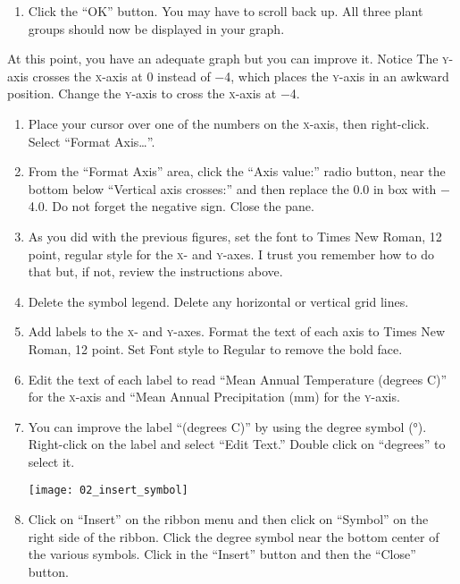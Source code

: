 \documentclass[12pt, hidelinks]{exam}
\newcommand*\axis[1]{{\scshape #1}-axis}
\begin{document}
\begin{questions}
\begin{enumerate}[resume]
	\item Click the “OK” button. You may have to scroll back up. All three plant groups should now be displayed in your graph. 
\end{enumerate}

At this point, you have an adequate graph but you can improve it. Notice The \axis{y} crosses the \axis{x} at 0 instead of $-$4, which places the \axis{y} in an awkward position. Change the \axis{y} to cross the \axis{x} at $-$4.

\begin{enumerate}[resume]
	\item Place your cursor over one of the numbers on the \axis{x}, then right-click. Select “Format Axis\dots”.

	\item From the “Format Axis” area, click the “Axis value:” radio button, near the bottom below “Vertical axis crosses:” and then replace the 0.0 in box with $-$4.0. Do not forget the negative sign. Close the pane.

	\item As you did with the previous figures, set the font to Times New Roman, 12 point, regular style for the \textsc{x}- and \textsc{y}-axes. I trust you remember how to do that but, if not, review the instructions above.
	
	\item Delete the symbol legend. Delete any horizontal or vertical grid lines.

	\item Add labels to the \textsc{x}- and \textsc{y}-axes. Format the text of each axis to Times New Roman, 12 point. Set Font style to Regular to remove the bold face.

	\item Edit the text of each label to read “Mean Annual Temperature (degrees C)” for the \axis{x} and “Mean Annual Precipitation (mm) for the \axis{y}.

	\item You can improve the label “(degrees C)” by using the degree symbol (°). Right-click on the label and select “Edit Text.” Double click on “degrees” to select it.

\begin{center}
	\texttt{[image: 02\_insert\_symbol]}
\end{center}

	\item Click on “Insert” on the ribbon menu and then click on “Symbol” on the right side of the ribbon. Click the degree symbol near the bottom center of the various symbols. Click in the “Insert” button and then the “Close” button. 
	

\end{enumerate}
\end{questions}
\end{document}
